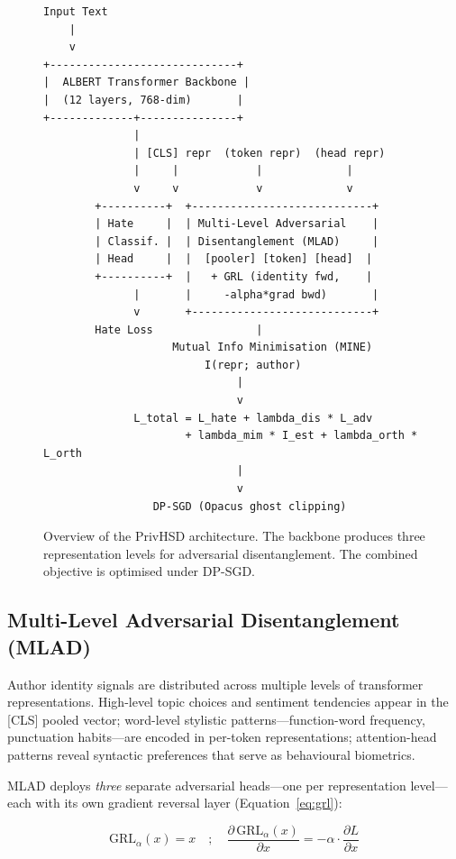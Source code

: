 \documentclass{article}
\begin{document}
\begin{figure}[h]
  \centering
  \begin{verbatim}
Input Text
    |
    v
+-----------------------------+
|  ALBERT Transformer Backbone |
|  (12 layers, 768-dim)       |
+-------------+---------------+
              |
              | [CLS] repr  (token repr)  (head repr)
              |     |            |             |
              v     v            v             v
        +----------+  +----------------------------+
        | Hate     |  | Multi-Level Adversarial    |
        | Classif. |  | Disentanglement (MLAD)     |
        | Head     |  |  [pooler] [token] [head]  |
        +----------+  |   + GRL (identity fwd,    |
              |       |     -alpha*grad bwd)       |
              v       +----------------------------+
        Hate Loss                |
                    Mutual Info Minimisation (MINE)
                         I(repr; author)
                              |
                              v
              L_total = L_hate + lambda_dis * L_adv
                      + lambda_mim * I_est + lambda_orth * L_orth
                              |
                              v
                 DP-SGD (Opacus ghost clipping)
  \end{verbatim}
  \caption{Overview of the PrivHSD architecture. The backbone produces three
           representation levels for adversarial disentanglement. The combined
           objective is optimised under DP-SGD.}
  \label{fig:arch}
\end{figure}

\subsection{Multi-Level Adversarial Disentanglement (MLAD)}

Author identity signals are distributed across multiple levels of
transformer representations. High-level topic choices and sentiment
tendencies appear in the [CLS] pooled vector; word-level stylistic
patterns---function-word frequency, punctuation habits---are encoded in
per-token representations; attention-head patterns reveal syntactic
preferences that serve as behavioural biometrics.

MLAD deploys \emph{three} separate adversarial heads---one per
representation level---each with its own gradient reversal layer
(Equation~\ref{eq:grl}):

\begin{equation}
\label{eq:grl}
\text{GRL}_{\alpha}(x) = x \quad;\quad
\frac{\partial\,\text{GRL}_{\alpha}(x)}{\partial x} = -\alpha \cdot \frac{\partial L}{\partial x}
\end{equation}
\end{document}
